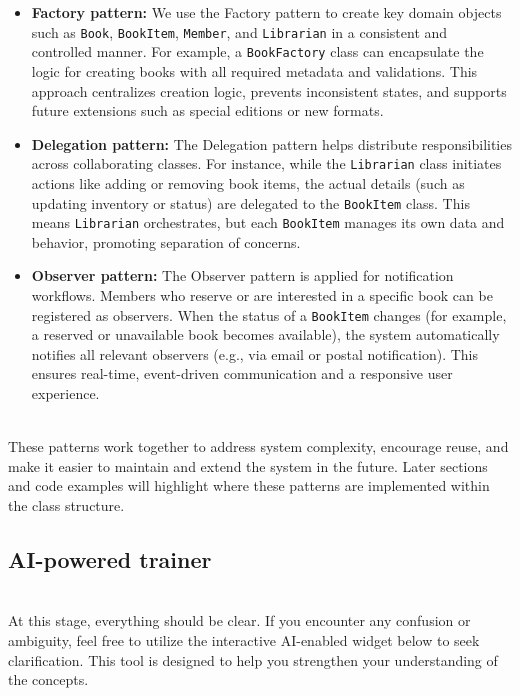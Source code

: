 \begin{itemize}
\item
\protect{}\label{z2xf0EbrrGNQKAhZ81fWm}
\textbf{Factory pattern:} We use the Factory pattern to create key domain objects such as \texttt{Book}, \texttt{BookItem}, \texttt{Member}, and \texttt{Librarian} in a consistent and controlled manner. For example, a \texttt{BookFactory} class can encapsulate the logic for creating books with all required metadata and validations. This approach centralizes creation logic, prevents inconsistent states, and supports future extensions such as special editions or new formats.
\item
\protect{}\label{FKiDKsm-Qsh2Z4X3g18R0}
\textbf{Delegation pattern:} The Delegation pattern helps distribute responsibilities across collaborating classes. For instance, while the \texttt{Librarian} class initiates actions like adding or removing book items, the actual details (such as updating inventory or status) are delegated to the \texttt{BookItem} class. This means \texttt{Librarian} orchestrates, but each \texttt{BookItem} manages its own data and behavior, promoting separation of concerns.
\item
\protect{}\label{Akp_gGz5KOxihUkc3QBSk}
\textbf{Observer pattern:} The Observer pattern is applied for notification workflows. Members who reserve or are interested in a specific book can be registered as observers. When the status of a \texttt{BookItem} changes (for example, a reserved or unavailable book becomes available), the system automatically notifies all relevant observers (e.g., via email or postal notification). This ensures real-time, event-driven communication and a responsive user experience.
\end{itemize}
\\
These patterns work together to address system complexity, encourage reuse, and make it easier to maintain and extend the system in the future. Later sections and code examples will highlight where these patterns are implemented within the class structure.

\subsection{AI-powered trainer}\label{RETyHp4NJ1-3w2f9vcB6t}
\\
At this stage, everything should be clear. If you encounter any confusion or ambiguity, feel free to utilize the interactive AI-enabled widget below to seek clarification. This tool is designed to help you strengthen your understanding of the concepts.

